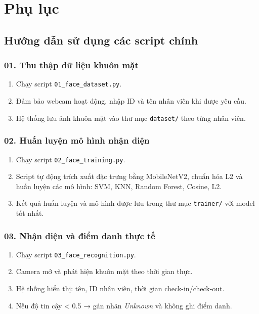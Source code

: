 \documentclass[a4paper]{book}
\begin{document}
\appendix
\chapter{Phụ lục}

\section{Hướng dẫn sử dụng các script chính}

\subsection*{01. Thu thập dữ liệu khuôn mặt}
\begin{enumerate}
    \item Chạy script \texttt{01\_face\_dataset.py}.
    \item Đảm bảo webcam hoạt động, nhập ID và tên nhân viên khi được yêu cầu.
    \item Hệ thống lưu ảnh khuôn mặt vào thư mục \texttt{dataset/} theo từng nhân viên.
\end{enumerate}

\subsection*{02. Huấn luyện mô hình nhận diện}
\begin{enumerate}
    \item Chạy script \texttt{02\_face\_training.py}.
    \item Script tự động trích xuất đặc trưng bằng MobileNetV2, chuẩn hóa L2 và huấn luyện các mô hình: SVM, KNN, Random Forest, Cosine, L2.
    \item Kết quả huấn luyện và mô hình được lưu trong thư mục \texttt{trainer/} với model tốt nhất.
\end{enumerate}

\subsection*{03. Nhận diện và điểm danh thực tế}
\begin{enumerate}
    \item Chạy script \texttt{03\_face\_recognition.py}.
    \item Camera mở và phát hiện khuôn mặt theo thời gian thực.
    \item Hệ thống hiển thị: tên, ID nhân viên, thời gian check-in/check-out.
    \item Nếu độ tin cậy < 0.5 → gán nhãn \textit{Unknown} và không ghi điểm danh.

\end{enumerate}
\end{document}
